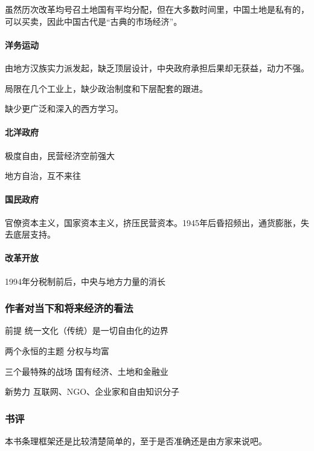 虽然历次改革均号召土地国有平均分配，但在大多数时间里，中国土地是私有的，可以买卖，因此中国古代是“古典的市场经济”。

\paragraph{洋务运动}

由地方汉族实力派发起，缺乏顶层设计，中央政府承担后果却无获益，动力不强。

局限在几个工业上，缺少政治制度和下层配套的跟进。

缺少更广泛和深入的西方学习。

\paragraph{北洋政府}

极度自由，民营经济空前强大

地方自治，互不来往

\paragraph{国民政府}

官僚资本主义，国家资本主义，挤压民营资本。1945年后昏招频出，通货膨胀，失去底层支持。

\paragraph{改革开放}

1994年分税制前后，中央与地方力量的消长

\subsubsection{作者对当下和将来经济的看法}
\begin{description*}
	\item[前提] 统一文化（传统）是一切自由化的边界
	\item[两个永恒的主题] 分权与均富
	\item[三个最特殊的战场] 国有经济、土地和金融业
	\item[新势力] 互联网、NGO、企业家和自由知识分子
\end{description*}

\subsubsection{书评}
本书条理框架还是比较清楚简单的，至于是否准确还是由方家来说吧。

